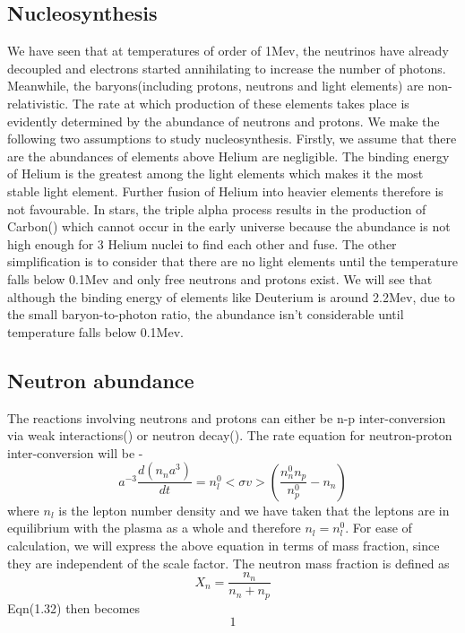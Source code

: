 \documentclass[12pt,a4paper,oneside]{book}
\begin{document}
\subsection{Nucleosynthesis}
We have seen that at temperatures of order of 1Mev, the neutrinos have already decoupled and electrons started annihilating to increase the number of photons. Meanwhile, the baryons(including protons, neutrons and light elements) are non-relativistic. The rate at which production of these elements takes place is evidently determined by the abundance of neutrons and protons. We make the following two assumptions to study nucleosynthesis. Firstly, we assume that there are the abundances of elements above Helium are negligible. The binding energy of Helium is the greatest among the light elements which makes it the most stable light element. Further fusion of Helium into  heavier elements therefore is not favourable. In stars, the triple alpha process results in the production of Carbon() which cannot occur in the early universe because the abundance is not high enough for 3 Helium nuclei to find each other and fuse.  The other simplification is to consider that there are no light elements until the temperature falls below 0.1Mev and only free neutrons and protons exist. We will see that although the binding energy of elements like Deuterium is around 2.2Mev, due to the small baryon-to-photon ratio, the abundance isn't considerable until temperature falls below 0.1Mev.
\subsection{ Neutron abundance}
The reactions involving neutrons and protons can either be n-p inter-conversion via weak interactions() or neutron decay(). The rate equation for neutron-proton inter-conversion will be -
\begin{equation}
    a^{-3}\frac{d(n_{n}a^{3})}{dt} = n_{l}^{0}<\sigma v>(\frac{n_{n}^{0}n_{p}}{n_{p}^{0}}-n_{n})
\end{equation}
where $n_{l}$ is the lepton number density and we have taken that the leptons are in equilibrium with the plasma as a whole and therefore $n_{l} = n_{l}^{0}$. For ease of calculation, we will express the above equation in terms of mass fraction, since they are independent of the scale factor. The neutron mass fraction is defined as 
\begin{equation}
    X_{n} = \frac{n_{n}}{n_{n}+n_{p}}
\end{equation}
Eqn(1.32) then becomes 
\begin{equation}
    1
\end{equation}
\end{document}
